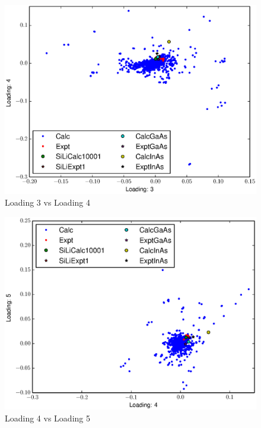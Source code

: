 \documentclass[12pt,letterpaper]{article}
\begin{document}
\begin{figure}[ht]
  \begin{center}
    \includegraphics[scale=0.8]{figs/eigenspace3-4.eps}
    \caption{Loading 3 vs  Loading 4}
  \end{center}
\end{figure}

\begin{figure}[ht]
  \begin{center}
    \includegraphics[scale=0.8]{figs/eigenspace4-5.eps}
    \caption{Loading 4 vs  Loading 5}
  \end{center}
\end{figure}
\clearpage
\end{document}
